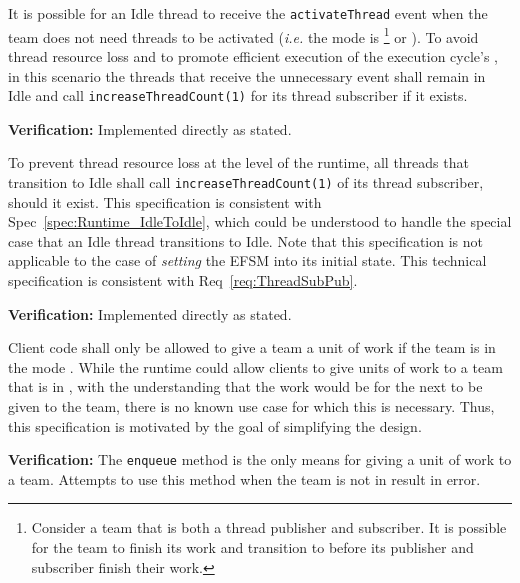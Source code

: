 \documentclass{article}
\begin{document}
\begin{spec}
\label{spec:Runtime_IdleToIdle}
It is possible for an Idle thread to receive the \texttt{activateThread} event
when the team does not need threads to be activated (\textit{i.e.} the mode is
\TeamIdle \footnote{Consider a team that is both a thread publisher and
subscriber.  It is possible for the team to finish its work and transition to
{\TeamIdle} before its publisher and subscriber finish their work.} or
\TeamRunningNoMoreWork).  To avoid thread resource loss and to promote efficient
execution of the execution cycle's \taskroutines, in this scenario the threads that
receive the unnecessary event shall remain in Idle and call
\texttt{increaseThreadCount(1)} for its thread subscriber if it exists.
\end{spec}
\textbf{Verification:}\hspace{0.125in} Implemented directly as stated.

\begin{spec}
\label{spec:Runtime_ForwardThreads}
To prevent thread resource loss at the level of the runtime, all threads that
transition to Idle shall call \texttt{increaseThreadCount(1)} of its thread
subscriber, should it exist.  This specification is consistent with
Spec~\ref{spec:Runtime_IdleToIdle}, which could be understood to handle the
special case that an Idle thread transitions to Idle.  Note that this
specification is not applicable to the case of \textit{setting} the EFSM into
its initial state. This technical specification is consistent with
Req~\ref{req:ThreadSubPub}.
\end{spec}
\textbf{Verification:}\hspace{0.125in} Implemented directly as stated.

\begin{spec}
\label{spec:Runtime_NoEnqueue}
Client code shall only be allowed to give a team a unit of work if the team is
in the mode {\TeamRunningOpen}.  While the runtime could allow clients to give
units of work to a team that is in {\TeamIdle}, with the understanding that the
work would be for the next \taskroutine to be given to the team, there is no known use
case for which this is necessary.  Thus, this specification is motivated by
the goal of simplifying the design.
\end{spec}
\textbf{Verification:}\hspace{0.125in}  The \texttt{enqueue} method is the only
means for giving a unit of work to a team.  Attempts to use this method when the
team is not in {\TeamRunningOpen} result in error.\\
\end{document}
